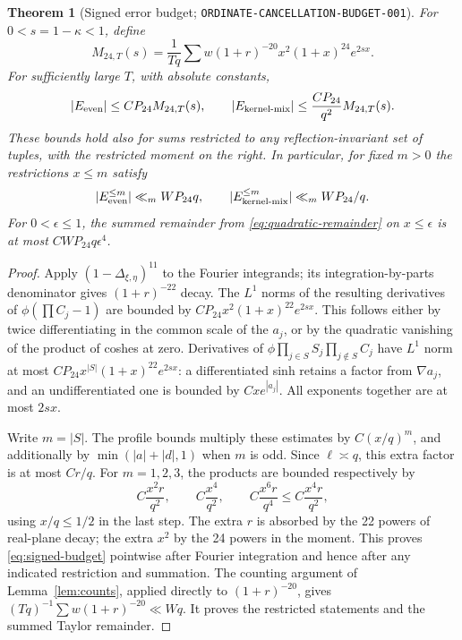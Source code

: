 \documentclass[11pt]{article}
\newtheorem{theorem}[lemma]{Theorem}
\begin{document}
\begin{theorem}[Signed error budget; \texttt{ORDINATE-CANCELLATION-BUDGET-001}]
\label{thm:cancellation-budget}
For $0<s=1-\kappa<1$, define
\[
 M_{24,T}(s)=\frac1{Tq}\sum w(1+r)^{-20}
                         x^2(1+x)^{24}e^{2sx}.
\]
For sufficiently large $T$, with absolute constants,
\begin{equation}\label{eq:signed-budget}
 |E_{\rm even}|\leq CP_{24}M_{24,T}(s),\qquad
 |E_{\rm kernel\text{-}mix}|\leq\frac{CP_{24}}{q^2}M_{24,T}(s).
\end{equation}
These bounds hold also for sums restricted to any reflection-invariant
set of tuples, with the restricted moment on the right. In particular,
for fixed $m>0$ the restrictions $x\leq m$ satisfy
\[
 |E_{\rm even}^{\leq m}|\ll_m WP_{24}q,\qquad
 |E_{\rm kernel\text{-}mix}^{\leq m}|\ll_m WP_{24}/q.
\]
For $0<\epsilon\leq1$, the summed remainder from
\eqref{eq:quadratic-remainder} on $x\leq\epsilon$ is at most
$CWP_{24}q\epsilon^4$.
\end{theorem}
\begin{proof}
Apply $(1-\Delta_{\xi,\eta})^{11}$ to the Fourier integrands; its
integration-by-parts denominator gives $(1+r)^{-22}$ decay.
The $L^1$ norms of the resulting derivatives of
$\phi(\prod C_j-1)$ are bounded by
$CP_{24}x^2(1+x)^{22}e^{2sx}$. This follows either by twice differentiating
in the common scale of the $a_j$, or by the quadratic vanishing of the
product of coshes at zero. Derivatives of
$\phi\prod_{j\in S}S_j\prod_{j\notin S}C_j$ have $L^1$ norm at most
$CP_{24}x^{|S|}(1+x)^{22}e^{2sx}$: a differentiated sinh retains a
factor from $\nabla a_j$, and an undifferentiated one is bounded by
$C x e^{|a_j|}$. All exponents together are at most $2sx$.

Write $m=|S|$. The profile bounds multiply these estimates by
$C(x/q)^m$, and additionally by $\min(|a|+|d|,1)$ when $m$ is odd.
Since $\ell\asymp q$, this extra factor is at most $Cr/q$.
For $m=1,2,3$, the products are bounded respectively by
\[
 C\frac{x^2r}{q^2},\qquad C\frac{x^4}{q^2},\qquad
 C\frac{x^6r}{q^4}\leq C\frac{x^4r}{q^2},
\]
using $x/q\leq1/2$ in the last step. The extra $r$ is absorbed by the
22 powers of real-plane decay; the extra $x^2$ by the 24 powers in the
moment. This proves \eqref{eq:signed-budget} pointwise after Fourier
integration and hence after any indicated restriction and summation.
The counting argument of Lemma~\ref{lem:counts}, applied directly to
$(1+r)^{-20}$, gives $(Tq)^{-1}\sum w(1+r)^{-20}\ll Wq$.
It proves the restricted statements and the summed Taylor remainder.
\end{proof}
\end{document}
